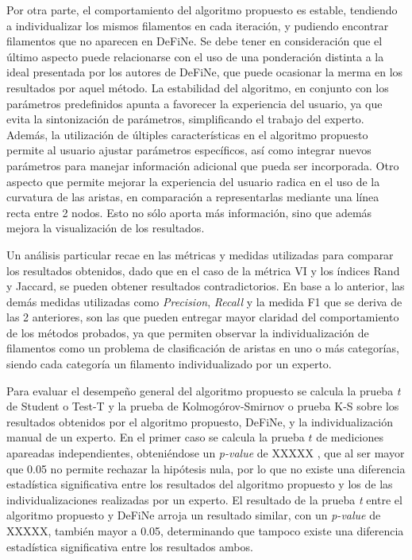 Por otra parte, el comportamiento del algoritmo propuesto es estable, tendiendo a individualizar los mismos filamentos en cada iteraci\'on, y pudiendo encontrar filamentos que no aparecen en DeFiNe. Se debe tener en consideraci\'on que el \'ultimo aspecto puede relacionarse con el uso de una ponderaci\'on distinta a la ideal presentada por los autores de DeFiNe, que puede ocasionar la merma en los resultados por aquel m\'etodo. La estabilidad del algoritmo, en conjunto con los par\'ametros predefinidos apunta a favorecer la experiencia del usuario, ya que evita la sintonizaci\'on de par\'ametros, simplificando el trabajo del experto. Adem\'as, la utilizaci\'on de \'ultiples caracter\'isticas en el algoritmo propuesto permite al usuario ajustar par\'ametros espec\'ificos, as\'i como integrar nuevos par\'ametros para manejar informaci\'on adicional que pueda ser incorporada. Otro aspecto que permite mejorar la experiencia del usuario radica en el uso de la curvatura de las aristas, en comparaci\'on a representarlas mediante una l\'inea recta entre 2 nodos. Esto no s\'olo aporta m\'as informaci\'on, sino que adem\'as mejora la visualizaci\'on de los resultados. 

Un an\'alisis particular recae en las m\'etricas y medidas utilizadas para comparar los resultados obtenidos, dado que en el caso de la m\'etrica VI y los \'indices Rand y Jaccard, se pueden obtener resultados contradictorios. En base a lo anterior, las dem\'as medidas utilizadas como {\it Precision}, {\it Recall} y la medida F1 que se deriva de las 2 anteriores, son las que pueden entregar mayor claridad del comportamiento de los m\'etodos probados, ya que permiten observar la individualizaci\'on de filamentos como un problema de clasificaci\'on de aristas en uno o m\'as categor\'ias, siendo cada  categor\'ia un filamento individualizado por un experto.


Para evaluar el desempe\~no general del algoritmo propuesto se calcula la prueba {\it t} de Student o Test-T y la prueba de Kolmog\'orov-Smirnov o prueba K-S sobre los resultados obtenidos por el algoritmo propuesto, DeFiNe, y la individualizaci\'on manual de un experto. En el primer caso se calcula la prueba $t$ de mediciones apareadas independientes, obteni\'endose un {\it p-value} de XXXXX , que al ser mayor que 0.05 no permite rechazar la hip\'otesis nula, por lo que no existe una diferencia estad\'istica significativa entre los resultados del algoritmo propuesto y los de las individualizaciones realizadas por un experto. El resultado de la prueba {\it t} entre el algoritmo propuesto y DeFiNe arroja un resultado similar, con un {\it p-value} de XXXXX, tambi\'en mayor a 0.05, determinando que tampoco existe una diferencia estad\'istica significativa entre los resultados ambos.


